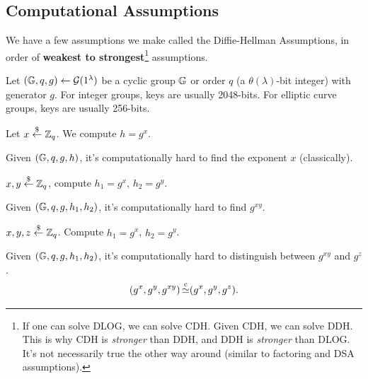 \subsection{Computational Assumptions}

We have a few assumptions we make called the Diffie-Hellman Assumptions, in order of \textbf{weakest to strongest}\footnote{If one can solve DLOG, we can solve CDH. Given CDH, we can solve DDH. This is why CDH is \emph{stronger} than DDH, and DDH is \emph{stronger} than DLOG. It's not necessarily true the other way around (similar to factoring and DSA assumptions). } assumptions.

Let $(\mathbb G, q, g)\leftarrow \mathcal{G}(1^\lambda)$ be a cyclic group $\mathbb G$ or order $q$ (a $\theta(\lambda)$-bit integer) with generator $g$. For integer groups, keys are usually 2048-bits. For elliptic curve groups, keys are usually 256-bits.

\begin{definition}
    Let $x\overset{\$}{\leftarrow} \mathbb Z_q$. We compute $h = g^x$.

    Given $(\mathbb G, q, g, h)$, it's computationally hard to find the exponent $x$ (classically).
\end{definition}

\begin{definition}
    $x, y\overset{\$}{\leftarrow} \mathbb Z_q$, compute $h_1 = g^x$, $h_2 = g^y$.

    Given $(\mathbb G, q, g, h_1, h_2)$, it's computationally hard to find $g^{xy}$.
\end{definition}

\begin{definition}
    $x, y, z\overset{\$}{\leftarrow} \mathbb Z_q$. Compute $h_1 = g^x$, $h_2 = g^y$.

    Given $(\mathbb G, q, g, h_1, h_2)$, it's computationally hard to distinguish between $g^{xy}$ and $g^z$.
    \[(g^x, g^y, g^{xy}) \operatorname{\overset{c}{\simeq}} (g^x, g^y, g^z).\]
\end{definition}


